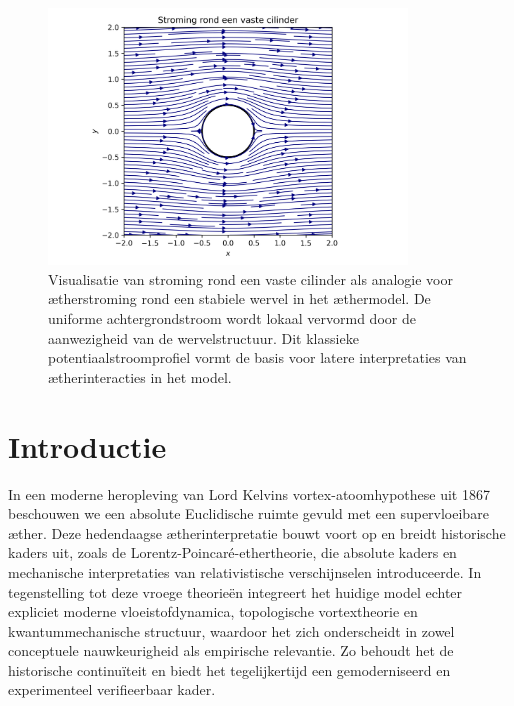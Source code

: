 \begin{figure}[htbp]
    \centering
    \includegraphics[width=0.85\textwidth]{images/02_cylinder_stroming}
    \caption{Visualisatie van stroming rond een vaste cilinder als analogie voor ætherstroming rond een stabiele wervel in het æthermodel. De uniforme achtergrondstroom wordt lokaal vervormd door de aanwezigheid van de wervelstructuur. Dit klassieke potentiaalstroomprofiel vormt de basis voor latere interpretaties van ætherinteracties in het model.}
    \label{fig:cylinderflow}
\end{figure}

\section{Introductie}
In een moderne heropleving van Lord Kelvins vortex-atoomhypothese uit 1867~\cite{Kelvin1867-vortex} beschouwen we een absolute Euclidische ruimte gevuld met een supervloeibare æther. Deze hedendaagse ætherinterpretatie bouwt voort op en breidt historische kaders uit, zoals de Lorentz-Poincaré-ethertheorie, die absolute kaders en mechanische interpretaties van relativistische verschijnselen introduceerde. In tegenstelling tot deze vroege theorieën integreert het huidige model echter expliciet moderne vloeistofdynamica, topologische vortextheorie en kwantummechanische structuur, waardoor het zich onderscheidt in zowel conceptuele nauwkeurigheid als empirische relevantie. Zo behoudt het de historische continuïteit en biedt het tegelijkertijd een gemoderniseerd en experimenteel verifieerbaar kader.

